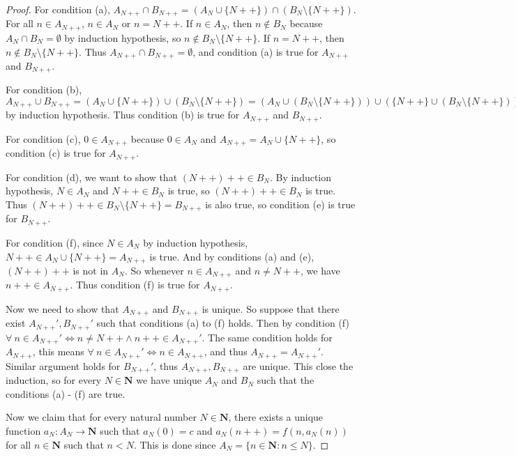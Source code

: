 \begin{proof}
For condition (a), \(A_{N++} \cap B_{N++} = (A_N \cup \{N++\}) \cap (B_N \setminus \{N++\})\).
For all \(n \in A_{N++}\), \(n \in A_N\) or \(n = N++\).
If \(n \in A_N\), then \(n \notin B_N\) because \(A_N \cap B_N = \emptyset\) by induction hypothesis, so \(n \notin B_N \setminus \{N++\}\).
If \(n = N++\), then \(n \notin B_N \setminus \{N++\}\).
Thus \(A_{N++} \cap B_{N++} = \emptyset\), and condition (a) is true for \(A_{N++}\) and \(B_{N++}\).

For condition (b), \(A_{N++} \cup B_{N++} = (A_N \cup \{N++\}) \cup (B_N \setminus \{N++\}) = (A_N \cup (B_N \setminus \{N++\})) \cup (\{N++\} \cup (B_N \setminus \{N++\})) = (A_N \cup (B_N \setminus \{N++\})) \cup B_N = A_N \cup B_N = \mathbf{N}\) by induction hypothesis.
Thus condition (b) is true for \(A_{N++}\) and \(B_{N++}\).

For condition (c), \(0 \in A_{N++}\) because \(0 \in A_N\) and \(A_{N++} = A_N \cup \{N++\}\), so condition (c) is true for \(A_{N++}\).

For condition (d), we want to show that \((N++)++ \in B_N\).
By induction hypothesis, \(N \in A_N\) and \(N++ \in B_N\) is true, so \((N++)++ \in B_N\) is true.
Thus \((N++)++ \in B_N \setminus \{N++\} = B_{N++}\) is also true, so condition (e) is true for \(B_{N++}\).

For condition (f), since \(N \in A_N\) by induction hypothesis, \(N++ \in A_N \cup \{N++\} = A_{N++}\) is true.
And by conditions (a) and (e), \((N++)++\) is not in \(A_N\).
So whenever \(n \in A_{N++}\) and \(n \neq N++\), we have \(n++ \in A_{N++}\).
Thus condition (f) is true for \(A_{N++}\).

Now we need to show that \(A_{N++}\) and \(B_{N++}\) is unique.
So suppose that there exist \(A_{N++}', B_{N++}'\) such that conditions (a) to (f) holds.
Then by condition (f) \(\forall\ n \in A_{N++}' \iff n \neq N++ \land n++ \in A_{N++}'\).
The same condition holds for \(A_{N++}\), this means \(\forall\ n \in A_{N++}' \iff n \in A_{N++}\), and thus \(A_{N++} = A_{N++}'\).
Similar argument holds for \(B_{N++}'\), thus \(A_{N++}, B_{N++}\) are unique.
This close the induction, so for every \(N \in \mathbf{N}\) we have unique \(A_N\) and \(B_N\) such that the conditions (a) - (f) are true.

Now we claim that for every natural number \(N \in \mathbf{N}\), there exists a unique function \(a_N : A_N \to \mathbf{N}\) such that \(a_N(0) = c\) and \(a_N(n++) = f(n, a_{N}(n))\) for all \(n \in \mathbf{N}\) such that \(n < N\).
This is done since \(A_N = \{n \in \mathbf{N} : n \leq N\}\).
\end{proof}

